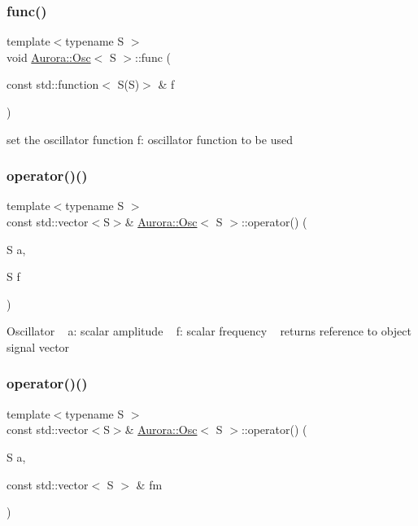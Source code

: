 \subsubsection{\texorpdfstring{func()}{func()}}
{\footnotesize\ttfamily template$<$typename S $>$ \\
void \hyperlink{class_aurora_1_1_osc}{Aurora\+::\+Osc}$<$ S $>$\+::func (\begin{DoxyParamCaption}\item[{const std\+::function$<$ S(S)$>$ \&}]{f }\end{DoxyParamCaption})\hspace{0.3cm}{\ttfamily [inline]}}

set the oscillator function f\+: oscillator function to be used \mbox{\label{class_aurora_1_1_osc_a2a36c0afda86b6fabad4ed3ca0f510af}} 
\subsubsection{\texorpdfstring{operator()()}{operator()()}\hspace{0.1cm}{\footnotesize\ttfamily [1/4]}}
{\footnotesize\ttfamily template$<$typename S $>$ \\
const std\+::vector$<$S$>$\& \hyperlink{class_aurora_1_1_osc}{Aurora\+::\+Osc}$<$ S $>$\+::operator() (\begin{DoxyParamCaption}\item[{S}]{a,  }\item[{S}]{f }\end{DoxyParamCaption})\hspace{0.3cm}{\ttfamily [inline]}}

Oscillator ~\newline
a\+: scalar amplitude ~\newline
f\+: scalar frequency ~\newline
returns reference to object signal vector \mbox{\label{class_aurora_1_1_osc_af48611ef63363221de325d8976a1ec56}} 
\subsubsection{\texorpdfstring{operator()()}{operator()()}\hspace{0.1cm}{\footnotesize\ttfamily [2/4]}}
{\footnotesize\ttfamily template$<$typename S $>$ \\
const std\+::vector$<$S$>$\& \hyperlink{class_aurora_1_1_osc}{Aurora\+::\+Osc}$<$ S $>$\+::operator() (\begin{DoxyParamCaption}\item[{S}]{a,  }\item[{const std\+::vector$<$ S $>$ \&}]{fm }\end{DoxyParamCaption})\hspace{0.3cm}{\ttfamily [inline]}}

